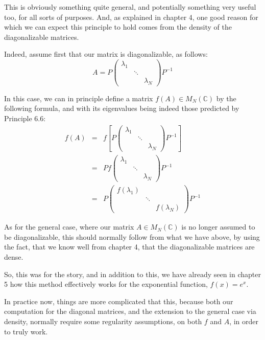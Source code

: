 \documentclass[12pt]{amsbook}
\begin{document}
This is obviously something quite general, and potentially something very useful too, for all sorts of purposes. And, as explained in chapter 4, one good reason for which we can expect this principle to hold comes from the density of the diagonalizable matrices. 

\bigskip

Indeed, assume first that our matrix is diagonalizable, as follows:
$$A=P\begin{pmatrix}
\lambda_1\\
&\ddots\\
&&\lambda_N
\end{pmatrix}
P^{-1}$$

In this case, we can in principle define a matrix $f(A)\in M_N(\mathbb C)$ by the following formula, and with its eigenvalues being indeed those predicted by Principle 6.6:
\begin{eqnarray*}
f(A)
&=&f\left[P\begin{pmatrix}
\lambda_1\\
&\ddots\\
&&\lambda_N
\end{pmatrix}
P^{-1}\right]\\
&=&Pf\begin{pmatrix}
\lambda_1\\
&\ddots\\
&&\lambda_N
\end{pmatrix}
P^{-1}\\
&=&P\begin{pmatrix}
f(\lambda_1)\\
&\ddots\\
&&f(\lambda_N)
\end{pmatrix}
P^{-1}
\end{eqnarray*}

As for the general case, where our matrix $A\in M_N(\mathbb C)$ is no longer assumed to be diagonalizable, this should normally follow from what we have above, by using the fact, that we know well from chapter 4, that the diagonalizable matrices are dense.

\bigskip

So, this was for the story, and in addition to this, we have already seen in chapter 5 how this method effectively works for the exponential function, $f(x)=e^x$.

\bigskip

In practice now, things are more complicated that this, because both our computation for the diagonal matrices, and the extension to the general case via density, normally require some regularity assumptions, on both $f$ and $A$, in order to truly work.
\end{document}
